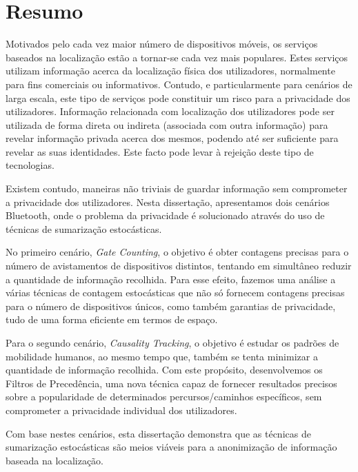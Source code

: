 \chapter*{Resumo}
Motivados pelo cada vez maior número de dispositivos móveis, os
serviços baseados na localização estão a tornar-se cada vez mais
populares.  Estes serviços utilizam informação acerca da localização
física dos utilizadores, normalmente para fins comerciais ou
informativos. Contudo, e particularmente para cenários de larga
escala, este tipo de serviços pode constituir um risco para a
privacidade dos utilizadores. Informação relacionada com localização
dos utilizadores pode ser utilizada de forma direta ou indireta
(associada com outra informação) para revelar informação privada
acerca dos mesmos, podendo até ser suficiente para revelar as suas
identidades.  Este facto pode levar à rejeição deste tipo de
tecnologias.

Existem contudo, maneiras não triviais de guardar informação sem
comprometer a privacidade dos utilizadores.  Nesta dissertação,
apresentamos dois cenários Bluetooth, onde o problema da privacidade é
solucionado através do uso de técnicas de sumarização estocásticas.

No primeiro cenário, \textit{Gate Counting}, o objetivo é obter
contagens precisas para o número de avistamentos de dispositivos
distintos, tentando em simultâneo reduzir a quantidade de informação
recolhida. Para esse efeito, fazemos uma análise a várias técnicas de
contagem estocásticas que não só fornecem contagens precisas para o
número de dispositivos únicos, como também garantias de privacidade,
tudo de uma forma eficiente em termos de espaço.

Para o segundo cenário, \textit{Causality Tracking}, o objetivo é
estudar os padrões de mobilidade humanos, ao mesmo tempo que, também
se tenta minimizar a quantidade de informação recolhida.  Com este
propósito, desenvolvemos os Filtros de Precedência, uma nova técnica
capaz de fornecer resultados precisos sobre a popularidade de
determinados percursos/caminhos específicos, sem comprometer a
privacidade individual dos utilizadores.

Com base nestes cenários, esta dissertação demonstra que as técnicas
de sumarização estocásticas são meios viáveis para a anonimização de
informação baseada na localização.

